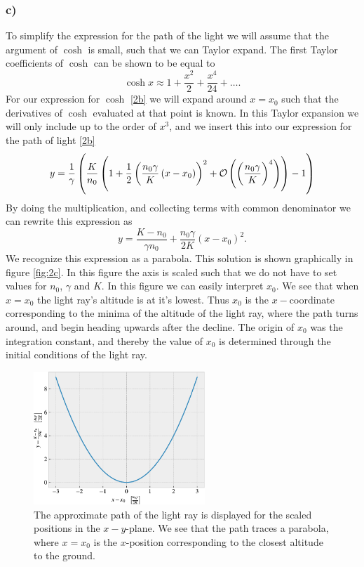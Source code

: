 \documentclass[12pt,twoside]{article}
\DeclareRobustCommand{\bigO}{%
  \text{\usefont{OMS}{cmsy}{m}{n}O}%
}
\begin{document}
\subsubsection*{c)}
To simplify the expression for the path of the light we will assume that the argument of $\cosh{}$ is small, such that we can Taylor expand. The first Taylor coefficients of $\cosh{}$ can be shown \cite{Rottmann} to be equal to
\begin{equation}
  \cosh{x}\approx1+\frac{x^2}{2} + \frac{x^4}{24} + \ldots.
\end{equation}
For our expression for $\cosh{}$ \eqref{2b} we will expand around $x=x_0$ such that the derivatives of $\cosh{}$ evaluated at that point is known. In this Taylor expansion we will only include up to the order of $x^3$, and we insert this into our expression for the path of light \eqref{2b}
\begin{equation}
   y = \frac{1}{\gamma}\left(\frac{K}{n_0}\left(1+\frac{1}{2}\left(\frac{n_0\gamma}{K}\left(x-x_0\right)\right)^2 + \bigO\left(\left(\frac{n_0\gamma}{K}\right)^4\right) \right)-1\right)
\end{equation}
By doing the multiplication, and collecting terms with common denominator we can rewrite this expression as
\begin{equation}
   y = \frac{K-n_0}{\gamma n_0} + \frac{n_0\gamma}{2K}\left(x-x_0\right)^2.
\end{equation}
We recognize this expression as a parabola. This solution is shown graphically in figure \vref{fig:2c}. In this figure the axis is scaled such that we do not have to set values for $n_0$, $\gamma$ and $K$. In this figure we can easily interpret $x_0$. We see that when $x=x_0$ the light ray's altitude is at it's lowest. Thus $x_0$ is the $x-$coordinate corresponding to the minima of the altitude of the light ray, where the path turns around, and begin heading upwards after the decline. The origin of $x_0$ was the integration constant, and thereby the value of $x_0$ is determined through the initial conditions of the light ray.
\begin{figure}[h!]
  \centering
  \includegraphics[width=0.575\textwidth]{../figures/2c.pdf}
  \caption{The approximate path of the light ray is displayed for the scaled positions in the $x-y$-plane. We see that the path traces a parabola, where $x=x_0$ is the $x$-position corresponding to the closest altitude to the ground.}
  \label{fig:2c}
\end{figure}
\end{document}
